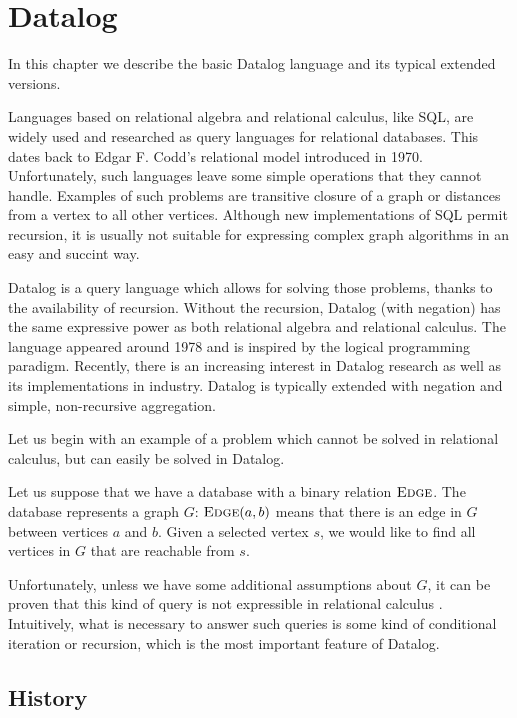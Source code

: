 
\chapter{Datalog}\label{r:datalog}

In this chapter we describe the basic Datalog language and its typical extended versions.

Languages based on relational algebra and relational calculus, like SQL, are widely used and researched as query languages for relational databases. This dates back to Edgar F. Codd's relational model \cite{coddrelmodel} introduced in 1970. Unfortunately, such languages leave some simple operations that they cannot handle. Examples of such problems are transitive closure of a graph or distances from a vertex to all other vertices. Although new implementations of SQL permit recursion, it is usually not suitable for expressing complex graph algorithms in an easy and succint way.

Datalog \cite{fod} is a query language which allows for solving those problems, thanks to the availability of recursion. Without the recursion, Datalog (with negation) has the same expressive power as both relational algebra and relational calculus. The language appeared around 1978 and is inspired by the logical programming paradigm. Recently, there is an increasing interest in Datalog research as well as its implementations in industry. Datalog is typically extended with negation and simple, non-recursive aggregation.

Let us begin with an example of a problem which cannot be solved in relational calculus, but can easily be solved in Datalog.

Let us suppose that we have a database with a binary relation $\textsc{Edge}$. The database represents a graph $G$: $\textsc{Edge}(a, b)$ means that there is an edge in $G$ between vertices $a$ and $b$. Given a selected vertex $s$, we would like to find all vertices in $G$ that are reachable from $s$.

Unfortunately, unless we have some additional assumptions about $G$, it can be proven that this kind of query is not expressible in relational calculus \cite{fod}. Intuitively, what is necessary to answer such queries is some kind of conditional iteration or recursion, which is the most important feature of Datalog.

\section{History}

